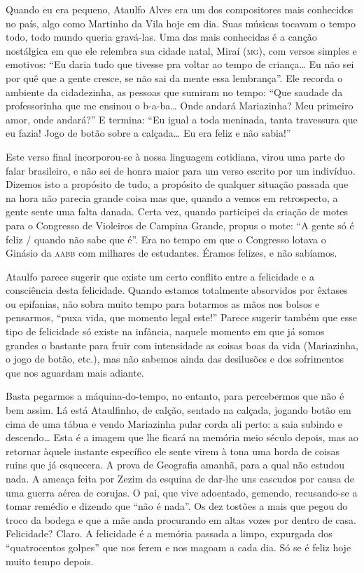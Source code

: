 Quando eu era pequeno, Ataulfo Alves era um dos compositores mais
conhecidos no país, algo como Martinho da Vila hoje em dia. Suas
músicas tocavam o tempo todo, todo mundo queria gravá-las. Uma das
mais conhecidas é a canção nostálgica em que ele relembra sua cidade
natal, Miraí (\textsc{mg}), com versos simples e emotivos: “Eu daria tudo que
tivesse pra voltar ao tempo de criança… Eu não sei por quê que a
gente cresce, se não sai da mente essa lembrança”.  Ele recorda o
ambiente da cidadezinha, as pessoas que sumiram no tempo: “Que
saudade da professorinha que me ensinou o b-a-ba… Onde andará
Mariazinha? Meu primeiro amor, onde andará?” E termina: “Eu igual a
toda meninada, tanta travessura que eu fazia! Jogo de botão sobre a
calçada… Eu era feliz e não sabia!”

Este verso final incorporou-se à nossa linguagem cotidiana, virou uma
parte do falar brasileiro, e não sei de honra maior para um verso
escrito por um indivíduo. Dizemos isto a propósito de tudo, a
propósito de qualquer situação passada que na hora não parecia grande
coisa mas que, quando a vemos em retrospecto, a gente sente uma falta
danada. Certa vez, quando participei da criação de motes para o
Congresso de Violeiros de Campina Grande, propus o mote: “A gente só
é feliz / quando não sabe que é”. Era no tempo em que o Congresso
lotava o Ginásio da \textsc{aabb} com milhares de estudantes. Éramos felizes,
e não sabíamos.

Ataulfo parece sugerir que existe um certo conflito entre a felicidade
e a consciência desta felicidade. Quando estamos totalmente
absorvidos por êxtases ou epifanias, não sobra muito tempo para
botarmos as mãos nos bolsos e pensarmos, “puxa vida, que momento
legal este!”  Parece sugerir também que esse tipo de felicidade só
existe na infância, naquele momento em que já somos grandes o
bastante para fruir com intensidade as coisas boas da vida
(Mariazinha, o jogo de botão, etc.), mas não sabemos ainda das
desilusões e dos sofrimentos que nos aguardam mais adiante.

Basta pegarmos a máquina-do-tempo, no entanto, para percebermos que
não é bem assim. Lá está Ataulfinho, de calção, sentado na calçada,
jogando botão em cima de uma tábua e vendo Mariazinha pular corda ali
perto: a saia subindo e descendo… Esta é a imagem que lhe ficará na
memória meio século depois, mas ao retornar àquele instante
específico ele sente virem à tona uma horda de coisas ruins que já
esquecera. A prova de Geografia amanhã, para a qual não estudou nada.
A ameaça feita por Zezim da esquina de dar-lhe uns cascudos por causa
de uma guerra aérea de corujas. O pai, que vive adoentado, gemendo,
recusando-se a tomar remédio e dizendo que “não é nada”. Os dez
tostões a mais que pegou do troco da bodega e que a mãe anda
procurando em altas vozes por dentro de casa. Felicidade? Claro. A
felicidade é a memória passada a limpo, expurgada dos “quatrocentos
golpes” que nos ferem e nos magoam a cada dia. Só se é feliz hoje
muito tempo depois.

